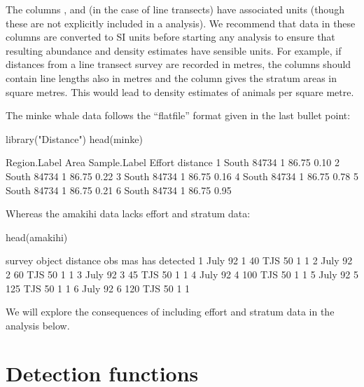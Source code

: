 \documentclass[article]{jss}
\begin{document}
The columns ,  and (in the case of line
transects)  have associated units (though these are not
explicitly included in a  analysis). We recommend that
data in these columns are converted to SI units before starting any
analysis to ensure that resulting abundance and density estimates have
sensible units. For example, if distances from a line transect survey
are recorded in metres, the  columns should contain line
lengths also in metres and the  column gives the stratum
areas in square metres. This would lead to density estimates of animals
per square metre.

The minke whale data follows the ``flatfile'' format given in the last
bullet point:

\begin{CodeChunk}
\begin{CodeInput}
library("Distance")
head(minke)
\end{CodeInput}
\begin{CodeOutput}
  Region.Label  Area Sample.Label Effort distance
1        South 84734            1  86.75     0.10
2        South 84734            1  86.75     0.22
3        South 84734            1  86.75     0.16
4        South 84734            1  86.75     0.78
5        South 84734            1  86.75     0.21
6        South 84734            1  86.75     0.95
\end{CodeOutput}
\end{CodeChunk}

Whereas the amakihi data lacks effort and stratum data:

\begin{CodeChunk}
\begin{CodeInput}
head(amakihi)
\end{CodeInput}
\begin{CodeOutput}
   survey object distance obs mas has detected
1 July 92      1       40 TJS  50   1        1
2 July 92      2       60 TJS  50   1        1
3 July 92      3       45 TJS  50   1        1
4 July 92      4      100 TJS  50   1        1
5 July 92      5      125 TJS  50   1        1
6 July 92      6      120 TJS  50   1        1
\end{CodeOutput}
\end{CodeChunk}

We will explore the consequences of including effort and stratum data in
the analysis below.

\section{Detection functions}\label{detection-functions}
\end{document}
